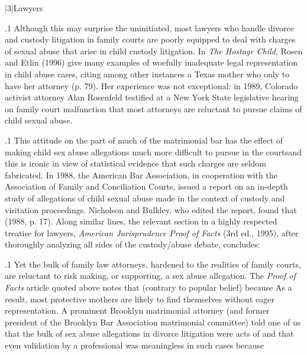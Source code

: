 \documentclass[11pt, twoside]{article}
\begin{document}
{\s|3|{Lawyers}

\p.1{%
\noindent{}Although this may surprise the uninitiated, most lawyers who handle divorce and custody litigation in family courts are poorly equipped to deal
with charges of sexual abuse that arise in child custody litigation.
In \textit{The Hostage Child}, Rosen and Etlin (1996) give many examples of woefully
inadequate legal representation in child abuse cases, citing among other
instances a Texas mother who  only to have her attorney  (p. 79). Her experience was not exceptional: in 1989,
Colorado activist attorney Alan Rosenfeld testified at a New York State
legislative hearing on family court malfunction that most attorneys are
reluctant to pursue claims of child sexual abuse.
}%

\p.1{%
This attitude on the part of much of the matrimonial bar has the effect of making child sex abuse allegations much more difficult to pursue
in the courts\mdash{}and this is ironic in view of statistical evidence that such
charges are seldom fabricated. In 1988, the American Bar Association,
in cooperation with the Association of Family and Conciliation Courts,
issued a report on an in-depth study of allegations of child sexual abuse
made in the context of custody and visitation proceedings. Nicholson
and Bulkley, who edited the report, found that  (1988, p. 17). Along similar lines, the relevant section in a
highly respected treatise for lawyers,
\textit{American Jurisprudence Proof of
Facts} (3rd ed., 1995), after thoroughly analyzing all sides of the custody/abuse debate, concludes: 
}%

\p.1{%
Yet the bulk of family law attorneys, hardened to the realities of family
courts, are reluctant to risk making, or supporting, a sex abuse allegation.
The \textit{Proof of Facts} article quoted above notes that  (contrary to
popular belief) because  As a result,
most protective mothers are likely to find themselves without eager representation. A prominent Brooklyn matrimonial attorney (and former
president of the Brooklyn Bar Association matrimonial committee) told
one of us that the bulk of sex abuse allegations in divorce litigation were
acts of  and that even validation by a professional was meaningless in such cases because 
}%

}
\end{document}
